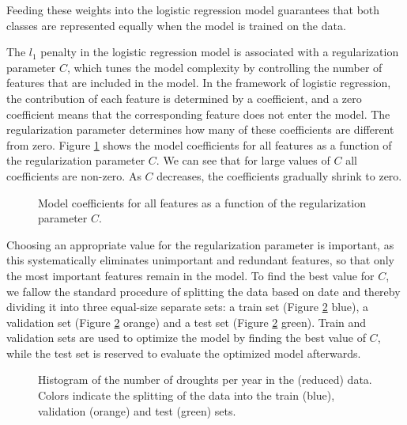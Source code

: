 \documentclass[10pt,parskip=half,
toc=sectionentrywithdots,
bibliography=totocnumbered,
captions=tableheading,numbers=noendperiod]{scrartcl}
\begin{document}
Feeding these weights into the logistic regression model guarantees that
both classes are represented equally when the model is trained on the
data.

The \(l_1\) penalty in the logistic regression model is associated with
a regularization parameter \(C\), which tunes the model complexity by
controlling the number of features that are included in the model. In
the framework of logistic regression, the contribution of each feature
is determined by a coefficient, and a zero coefficient means that the
corresponding feature does not enter the model. The regularization
parameter determines how many of these coefficients are different from
zero. Figure \ref{fig_l1} shows the model coefficients for all features
as a function of the regularization parameter \(C\). We can see that for
large values of \(C\) all coefficients are non-zero. As \(C\) decreases,
the coefficients gradually shrink to zero.

\begin{figure}[H]\begin{center}\end{center}\caption{Model coefficients for all features as a function of the regularization
parameter \(C\).}\label{fig_l1}\end{figure}

Choosing an appropriate value for the regularization parameter is
important, as this systematically eliminates unimportant and redundant
features, so that only the most important features remain in the model.
To find the best value for \(C\), we fallow the standard procedure of
splitting the data based on date and thereby dividing it into three
equal-size separate sets: a train set (Figure \ref{fig_split} blue), a
validation set (Figure \ref{fig_split} orange) and a test set (Figure
\ref{fig_split} green). Train and validation sets are used to optimize
the model by finding the best value of \(C\), while the test set is
reserved to evaluate the optimized model afterwards.

\begin{figure}[H]\begin{center}\end{center}\caption{Histogram of the number of droughts per year in the (reduced) data.
Colors indicate the splitting of the data into the train (blue),
validation (orange) and test (green) sets.}\label{fig_split}\end{figure}
\end{document}

